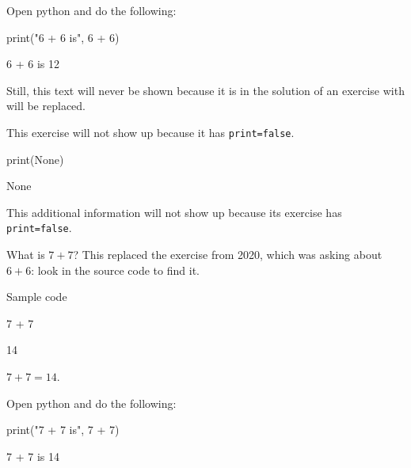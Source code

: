 \documentclass{book}
\begin{document}
\begin{additionalinformation}
Open python and do the following:

\begin{pycell}
print("6 + 6 is", 6 + 6)
\end{pycell}
\begin{pyexpectedoutput}
6 + 6 is 12
\end{pyexpectedoutput}

Still, this text will never be shown because it is in the solution of an exercise with will be replaced.
\end{additionalinformation}

\begin{exercise}[print=false]
This exercise will not show up because it has \texttt{print=false}.
\end{exercise}

\begin{solution}
\begin{pycell}
print(None)
\end{pycell}
\begin{pyexpectedoutput}
None
\end{pyexpectedoutput}
\end{solution}

\begin{additionalinformation}
This additional information will not show up because its exercise has \texttt{print=false}.
\end{additionalinformation}

\begin{exercise}[examdate={January 16, 2021}, examproblemnumber={1}, examproblemid={2021-01-16-01}]
  What is \(7 + 7\)? This replaced the exercise from 2020, which was asking about \(6 + 6\): look in the source code to find it.

Sample code
\begin{pycell}
7 + 7
\end{pycell}
\begin{pyexpectedoutput}
14
\end{pyexpectedoutput}
\end{exercise}

\begin{solution}
  \(7 + 7 = 14\).
\end{solution}

\begin{additionalinformation}
Open python and do the following:

\begin{pycell}
print("7 + 7 is", 7 + 7)
\end{pycell}
\begin{pyexpectedoutput}
7 + 7 is 14
\end{pyexpectedoutput}
\end{additionalinformation}
\end{document}
